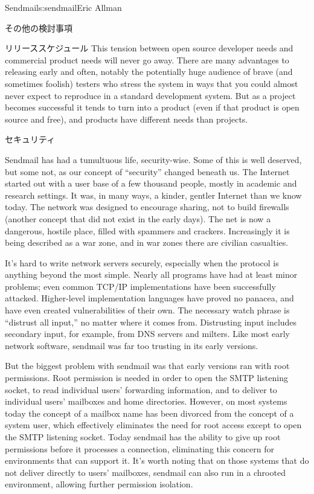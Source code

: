 \begin{aosachapter}{Sendmail}{s:sendmail}{Eric Allman}
\begin{aosasect1}{その他の検討事項}
\begin{aosasect2}{リリーススケジュール}
This tension between open source developer needs and commercial
product needs will never go away. There are many advantages to
releasing early and often, notably the potentially huge audience of
brave (and sometimes foolish) testers who stress the system in ways
that you could almost never expect to reproduce in a standard
development system. But as a project becomes successful it tends to
turn into a product (even if that product is open source and free),
and products have different needs than projects.

\end{aosasect2}

\end{aosasect1}

\begin{aosasect1}{セキュリティ}

Sendmail has had a tumultuous life, security-wise. Some of this is
well deserved, but some not, as our concept of ``security'' changed
beneath us. The Internet started out with a user base of a few
thousand people, mostly in academic and research settings. It was, in
many ways, a kinder, gentler Internet than we know today. The network
was designed to encourage sharing, not to build firewalls (another
concept that did not exist in the early days). The net is now a
dangerous, hostile place, filled with spammers and crackers.
Increasingly it is being described as a war zone, and in war zones
there are civilian casualties.

It's hard to write network servers securely, especially when the
protocol is anything beyond the most simple. Nearly all programs have
had at least minor problems; even common TCP/IP implementations have
been successfully attacked. Higher-level implementation languages have
proved no panacea, and have even created vulnerabilities of their
own. The necessary watch phrase is ``distrust all input,'' no matter
where it comes from. Distrusting input includes secondary input, for
example, from DNS servers and milters. Like most early network
software, sendmail was far too trusting in its early versions.

But the biggest problem with sendmail was that early versions ran with
root permissions. Root permission is needed in order to open the SMTP
listening socket, to read individual users' forwarding information,
and to deliver to individual users' mailboxes and home
directories. However, on most systems today the concept of a mailbox
name has been divorced from the concept of a system user, which
effectively eliminates the need for root access except to open the
SMTP listening socket. Today sendmail has the ability to give up root
permissions before it processes a connection, eliminating this concern
for environments that can support it. It's worth noting that on those
systems that do not deliver directly to users' mailboxes, sendmail can
also run in a chrooted environment, allowing further permission
isolation.


\end{aosasect1}
\end{aosachapter}

